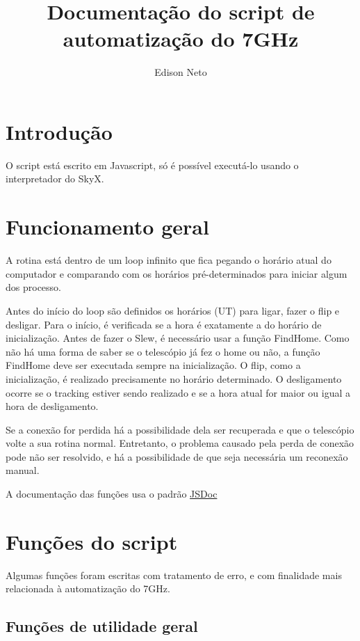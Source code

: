 \documentclass{article}
\title{Documentação do script de automatização do 7GHz}
\author{Edison Neto}
\begin{document}
\maketitle
\newpage
\tableofcontents
\newpage

\section{Introdução}

O script está escrito em Javascript, só é possível executá-lo usando o interpretador do SkyX.

\section{Funcionamento geral}

A rotina está dentro de um loop infinito que fica pegando o horário atual do computador e comparando com os horários pré-determinados para iniciar algum dos processo.

Antes do início do loop são definidos os horários (UT) para ligar, fazer o flip e desligar. Para o início, é verificada se a hora é exatamente a do horário de inicialização. Antes de fazer o Slew, é necessário usar a função FindHome. Como não há uma forma de saber se o telescópio já fez o home ou não, a função FindHome deve ser executada sempre na inicialização. O flip, como a inicialização, é realizado precisamente no horário determinado. O desligamento ocorre se o tracking estiver sendo realizado e se a hora atual for maior ou igual a hora de desligamento.

Se a conexão for perdida há a possibilidade dela ser recuperada e que o telescópio volte a sua rotina normal. Entretanto, o problema causado pela perda de conexão pode não ser resolvido, e há a possibilidade de que seja necessária um reconexão manual.

A documentação das funções usa o padrão \href{''http://usejsdoc.org/''}{JSDoc}


\section{Funções do script}

Algumas funções foram escritas com tratamento de erro, e com finalidade mais relacionada à automatização do 7GHz.

\subsection{Funções de utilidade geral}
\end{document}
